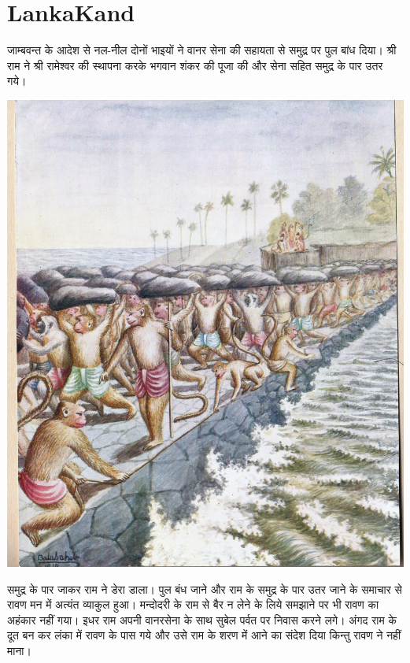 \documentclass[makeidx, 10pt, oneside, onecolumn, openright, final, svgnames, dvipsnames, extrafontsizes]{memoir}
\begin{document}
\chapter[लङ्काकाण्ड]{LankaKand}
\thispagestyle{empty}

\hspace{5mm}जाम्बवन्त के आदेश से नल-नील दोनों भाइयों ने वानर सेना की सहायता से समुद्र पर पुल बांध दिया। श्री राम ने श्री रामेश्वर की स्थापना करके भगवान शंकर की पूजा की और सेना सहित समुद्र के पार उतर गये।

 \begin{center}
\includegraphics[scale=0.05]{Building_a_Bridge_to_Sri_Lanka.jpg}
\end{center}

समुद्र के पार जाकर राम ने डेरा डाला। पुल बंध जाने और राम के समुद्र के पार उतर जाने के समाचार से रावण मन में अत्यंत व्याकुल हुआ। मन्दोदरी के राम से बैर न लेने के लिये समझाने पर भी रावण का अहंकार नहीं गया। इधर राम अपनी वानरसेना के साथ सुबेल पर्वत पर निवास करने लगे। अंगद राम के दूत बन कर लंका में रावण के पास गये और उसे राम के शरण में आने का संदेश दिया किन्तु रावण ने नहीं माना।
\end{document}
